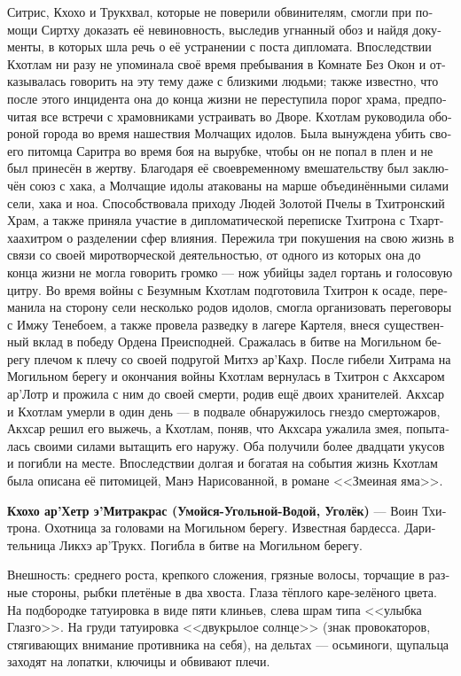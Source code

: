 \documentclass[a4paper,12pt,fleqn]{book}\usepackage{polyglossia}\setdefaultlanguage[babelshorthands=true]{russian}\setotherlanguage{english}\defaultfontfeatures{Ligatures=TeX,Mapping=tex-text}\usepackage{xcolor}\newcommand{\ml}[3]{#2}
\newcommand{\theterm}[3]{\textbf{\hypertarget{#1}{#2}} --- #3}
\begin{document}
{{Ситрис, Кхохо и Трукхвал, которые не поверили обвинителям, смогли при помощи Сиртху доказать её невиновность, выследив угнанный обоз и найдя документы, в которых шла речь о её устранении с поста дипломата.
Впоследствии Кхотлам ни разу не упоминала своё время пребывания в Комнате Без Окон и отказывалась говорить на эту тему даже с близкими людьми;
также известно, что после этого инцидента она до конца жизни не переступила порог храма, предпочитая все встречи с храмовниками устраивать во Дворе.
Кхотлам руководила обороной города во время нашествия Молчащих идолов.
Была вынуждена убить своего питомца Саритра во время боя на вырубке, чтобы он не попал в плен и не был принесён в жертву.
Благодаря её своевременному вмешательству был заключён союз с хака, а Молчащие идолы атакованы на марше объединёнными силами сели, хака и ноа.
Способствовала приходу Людей Золотой Пчелы в Тхитронский Храм, а также приняла участие в дипломатической переписке Тхитрона с Тхартхаахитром о разделении сфер влияния.
Пережила три покушения на свою жизнь в связи со своей миротворческой деятельностью, от одного из которых она до конца жизни не могла говорить громко --- нож убийцы задел гортань и голосовую цитру.
Во время войны с Безумным Кхотлам подготовила Тхитрон к осаде, переманила на сторону сели несколько родов идолов, смогла организовать переговоры с Имжу Тенебоем, а также провела разведку в лагере Картеля, внеся существенный вклад в победу Ордена Преисподней.
Сражалась в битве на Могильном берегу плечом к плечу со своей подругой Митхэ ар'Кахр.
После гибели Хитрама на Могильном берегу и окончания войны Кхотлам вернулась в Тхитрон с Акхсаром ар'Лотр и прожила с ним до своей смерти, родив ещё двоих хранителей.
Акхсар и Кхотлам умерли в один день --- в подвале обнаружилось гнездо смертожаров, Акхсар решил его выжечь, а Кхотлам, поняв, что Акхсара ужалила змея, попыталась своими силами вытащить его наружу.
Оба получили более двадцати укусов и погибли на месте.
Впоследствии долгая и богатая на события жизнь Кхотлам была описана её питомицей, Манэ Нарисованной, в романе <<Змеиная яма>>.}

\theterm{kchoho} %
{Кхохо ар'Хетр э'Митракрас (Умойся-Угольной-Водой, Уголёк)}
{Воин Тхитрона.
Охотница за головами на Могильном берегу.
Известная бардесса.
Дарительница Ликхэ ар'Трукх.
Погибла в битве на Могильном берегу.

Внешность: среднего роста, крепкого сложения, грязные волосы, торчащие в разные стороны, рыбки плетёные в два хвоста.
Глаза тёплого каре-зелёного цвета.
На подбородке татуировка в виде пяти клиньев, слева шрам типа <<улыбка Глазго>>.
На груди татуировка <<двукрылое солнце>> (знак провокаторов, стягивающих внимание противника на себя), на дельтах --- осьминоги, щупальца заходят на лопатки, ключицы и обвивают плечи.}

}
\end{document}

